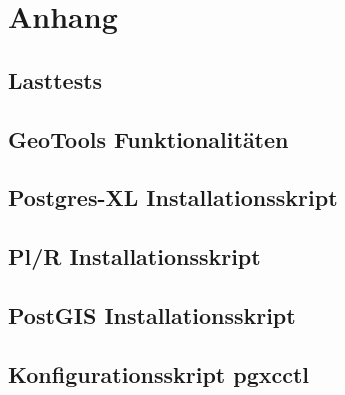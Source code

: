 






\frontmatter												%


\tableofcontents										%

\printglossary[title=Glossar] 			%
\printglossary[type=\acronymtype,title=Abk\"urzungsverzeichnis]	%

\listoffigures											%
\listoftables												%

\mainmatter													%


\appendix
\chapter{Anhang}
\section{Lasttests}
	
\section{GeoTools Funktionalitäten}
	
\section{Postgres-XL Installationsskript}
	
\section{Pl/R Installationsskript}

\section{PostGIS Installationsskript}

\section{Konfigurationsskript pgxcctl}

												

\pagestyle{empty}



